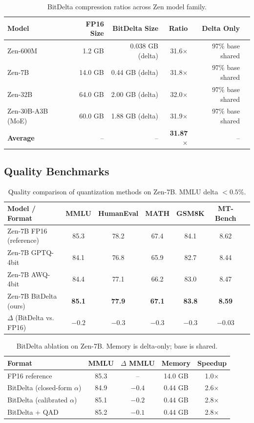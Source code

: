 \documentclass[11pt,a4paper]{article}
\begin{document}
\begin{table}[H]
\centering
\begin{tabular}{lrrrrr}
\toprule
\textbf{Model} & \textbf{FP16 Size} & \textbf{BitDelta Size} & \textbf{Ratio} & \textbf{Delta Only} \\
\midrule
Zen-600M & 1.2 GB & 0.038 GB (delta) & 31.6$\times$ & 97\% base shared \\
Zen-7B & 14.0 GB & 0.44 GB (delta) & 31.8$\times$ & 97\% base shared \\
Zen-32B & 64.0 GB & 2.00 GB (delta) & 32.0$\times$ & 97\% base shared \\
Zen-30B-A3B (MoE) & 60.0 GB & 1.88 GB (delta) & 31.9$\times$ & 97\% base shared \\
\midrule
\textbf{Average} & -- & -- & \textbf{31.87$\times$} & -- \\
\bottomrule
\end{tabular}
\caption{BitDelta compression ratios across Zen model family.}
\end{table}

\subsection{Quality Benchmarks}

\begin{table}[H]
\centering
\begin{tabular}{lcccccc}
\toprule
\textbf{Model / Format} & \textbf{MMLU} & \textbf{HumanEval} & \textbf{MATH} & \textbf{GSM8K} & \textbf{MT-Bench} \\
\midrule
Zen-7B FP16 (reference) & 85.3 & 78.2 & 67.4 & 84.1 & 8.62 \\
Zen-7B GPTQ-4bit & 84.1 & 76.8 & 65.9 & 82.7 & 8.44 \\
Zen-7B AWQ-4bit & 84.4 & 77.1 & 66.2 & 83.0 & 8.47 \\
Zen-7B BitDelta (ours) & \textbf{85.1} & \textbf{77.9} & \textbf{67.1} & \textbf{83.8} & \textbf{8.59} \\
\midrule
$\Delta$ (BitDelta vs. FP16) & $-0.2$ & $-0.3$ & $-0.3$ & $-0.3$ & $-0.03$ \\
\bottomrule
\end{tabular}
\caption{Quality comparison of quantization methods on Zen-7B. MMLU delta $< 0.5\%$.}
\end{table}

\begin{table}[H]
\centering
\begin{tabular}{lcccc}
\toprule
\textbf{Format} & \textbf{MMLU} & \textbf{$\Delta$ MMLU} & \textbf{Memory} & \textbf{Speedup} \\
\midrule
FP16 reference & 85.3 & -- & 14.0 GB & 1.0$\times$ \\
BitDelta (closed-form $\alpha$) & 84.9 & $-0.4$ & 0.44 GB & 2.6$\times$ \\
BitDelta (calibrated $\alpha$) & 85.1 & $-0.2$ & 0.44 GB & 2.8$\times$ \\
BitDelta + QAD & 85.2 & $-0.1$ & 0.44 GB & 2.8$\times$ \\
\bottomrule
\end{tabular}
\caption{BitDelta ablation on Zen-7B. Memory is delta-only; base is shared.}
\end{table}
\end{document}
